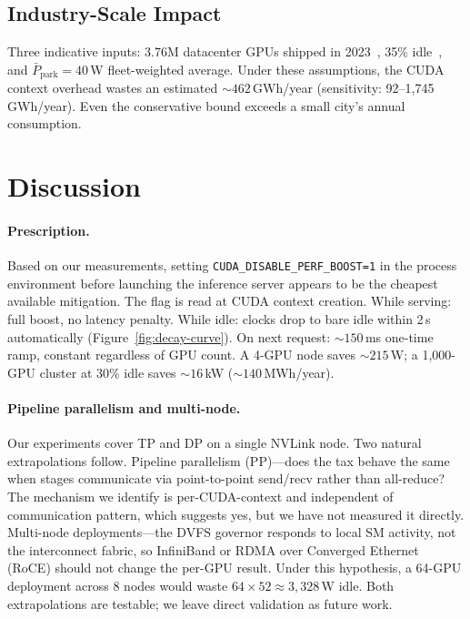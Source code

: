 \documentclass[sigconf,anonymous,review]{acmart}
\newcommand{\perfboost}{\texttt{CUDA\_\hspace{0pt}DISABLE\_\hspace{0pt}PERF\_\hspace{0pt}BOOST}}
\begin{document}
\subsection{Industry-Scale Impact}

Three indicative inputs: 3.76M datacenter GPUs shipped in 2023~\cite{nvidia-shipments}, 35\% idle~\cite{flexera}, and $\bar{P}_{\text{park}} = 40$\,W fleet-weighted average. Under these assumptions, the CUDA context overhead wastes an estimated ${\sim}462$\,GWh/year (sensitivity: 92--1{,}745\,GWh/year). Even the conservative bound exceeds a small city's annual consumption.

\section{Discussion}

\paragraph{Prescription.} Based on our measurements, setting \perfboost\texttt{=1} in the process environment before launching the inference server appears to be the cheapest available mitigation. The flag is read at CUDA context creation. While serving: full boost, no latency penalty. While idle: clocks drop to bare idle within 2\,s automatically (Figure~\ref{fig:decay-curve}). On next request: ${\sim}150$\,ms one-time ramp, constant regardless of GPU count. A 4-GPU node saves ${\sim}215$\,W; a 1{,}000-GPU cluster at 30\% idle saves ${\sim}16$\,kW (${\sim}140$\,MWh/year).

\paragraph{Pipeline parallelism and multi-node.} Our experiments cover TP and DP on a single NVLink node. Two natural extrapolations follow. Pipeline parallelism (PP)---does the tax behave the same when stages communicate via point-to-point send/recv rather than all-reduce? The mechanism we identify is per-CUDA-context and independent of communication pattern, which suggests yes, but we have not measured it directly. Multi-node deployments---the DVFS governor responds to local SM activity, not the interconnect fabric, so InfiniBand or RDMA over Converged Ethernet (RoCE) should not change the per-GPU result. Under this hypothesis, a 64-GPU deployment across 8 nodes would waste $64 \times 52 \approx 3{,}328$\,W idle. Both extrapolations are testable; we leave direct validation as future work.
\end{document}
